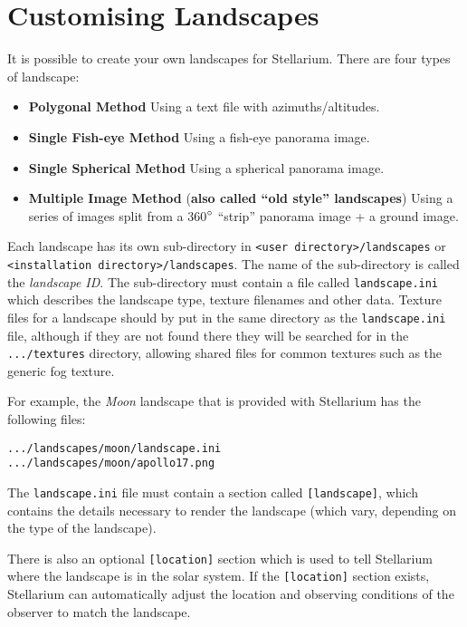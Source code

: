 
\chapter{Customising Landscapes}\label{customising-landscapes}

It is possible to create your own landscapes for Stellarium. There are
four types of landscape:

\begin{itemize}
\item
  \textbf{Polygonal Method} Using a text file with azimuths/altitudes.
\item
  \textbf{Single Fish-eye Method} Using a fish-eye panorama image.
\item
  \textbf{Single Spherical Method} Using a spherical panorama image.
\item
  \textbf{Multiple Image Method} (\textbf{also called ``old style''
  landscapes}) Using a series of images split from a 360$\degree$ ``strip''
  panorama image + a ground image.
\end{itemize}

Each landscape has its own sub-directory in
\texttt{\textless{}user\ directory\textgreater{}/landscapes} or
\texttt{\textless{}installation\ directory\textgreater{}/landscapes}.
The name of the sub-directory is called the \emph{landscape ID}. The
sub-directory must contain a file called \texttt{landscape.ini} which
describes the landscape type, texture filenames and other data. Texture
files for a landscape should by put in the same directory as the
\texttt{landscape.ini} file, although if they are not found there they
will be searched for in the \texttt{.../textures} directory, allowing
shared files for common textures such as the generic fog texture.

For example, the \emph{Moon} landscape that is provided with Stellarium
has the following files:

\texttt{.../landscapes/moon/landscape.ini}\\
\texttt{.../landscapes/moon/apollo17.png}

The \texttt{landscape.ini} file must contain a section called
\texttt{{[}landscape{]}}, which contains the details necessary to render
the landscape (which vary, depending on the type of the landscape).

There is also an optional \texttt{{[}location{]}} section which is used
to tell Stellarium where the landscape is in the solar system. If the
\texttt{{[}location{]}} section exists, Stellarium can automatically
adjust the location and observing conditions of the observer to match
the landscape.

